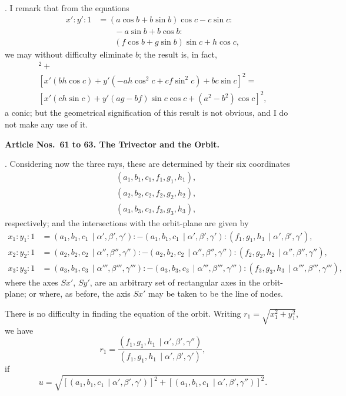 \documentclass[11pt,a4paper]{article}
\theoremstyle{definition}
\begin{document}
\newpage
{}. I remark that from the equations
\begin{align*}
x' : y' : 1 &= (a\cos b+b\sin b)\cos c - c\sin c :\\
&\qquad -a\sin b+b\cos b :\\
&\qquad (f\cos b+g\sin b)\sin c + h\cos c,
\end{align*}
we may without difficulty eliminate $b$; the result is, in fact,
\begin{multline*}
[x'(-ah\cos c) + y'(-bh\cos^2 c - cg\sin^2 c) - ac\sin c]^2 + \\
[x'(bh\cos c) + y'(-ah\cos^2 c + cf\sin^2 c) + bc\sin c]^2 = \\
[x'(ch\sin c) + y'(ag-bf)\sin c\cos c + (a^2-b^2)\cos c]^2,
\end{multline*}
a conic; but the geometrical signification of this result is not obvious, and I do not
make any use of it.

\bigskip
\noindent
\textbf{Article Nos.~61 to 63. The Trivector and the Orbit.}

\smallskip

. Considering now the three rays, these are determined by their six coordinates
\begin{align*}
&(a_1, b_1, c_1, f_1, g_1, h_1), \\
&(a_2, b_2, c_2, f_2, g_2, h_2), \\
&(a_3, b_3, c_3, f_3, g_3, h_3),
\end{align*}
respectively; and the intersections with the orbit-plane are given by
\begin{align*}
x_1 : y_1 : 1 &= (a_1,b_1,c_1\,\mid\alpha',\beta',\gamma')
: -(a_1,b_1,c_1\,\mid\alpha',\beta',\gamma') : (f_1,g_1,h_1\,\mid\alpha',\beta',\gamma'), \\
x_2 : y_2 : 1 &= (a_2,b_2,c_2\,\mid\alpha'',\beta'',\gamma'')
: -(a_2,b_2,c_2\,\mid\alpha'',\beta'',\gamma'') : (f_2,g_2,h_2\,\mid\alpha'',\beta'',\gamma''), \\
x_3 : y_3 : 1 &= (a_3,b_3,c_3\,\mid\alpha''',\beta''',\gamma''')
: -(a_3,b_3,c_3\,\mid\alpha''',\beta''',\gamma''') : (f_3,g_3,h_3\,\mid\alpha''',\beta''',\gamma'''),
\end{align*}
where the axes $Sx'$, $Sy'$, are an arbitrary set of rectangular axes in the orbit-plane;
or where, as before, the axis $Sx'$ may be taken to be the line of nodes.

There is no difficulty in finding the equation of the orbit. Writing $r_1=\sqrt{x_1^2+y_1^2}$,
we have
\[
r_1 = \frac{(f_1,g_1,h_1\,\mid\alpha',\beta',\gamma'')}{(f_1,g_1,h_1\,\mid\alpha',\beta',\gamma')},
\]
if
\[
u = \sqrt{[(a_1,b_1,c_1\,\mid\alpha',\beta',\gamma')]^2 + [(a_1,b_1,c_1\,\mid\alpha',\beta',\gamma'')]^2}.\]
\end{document}
